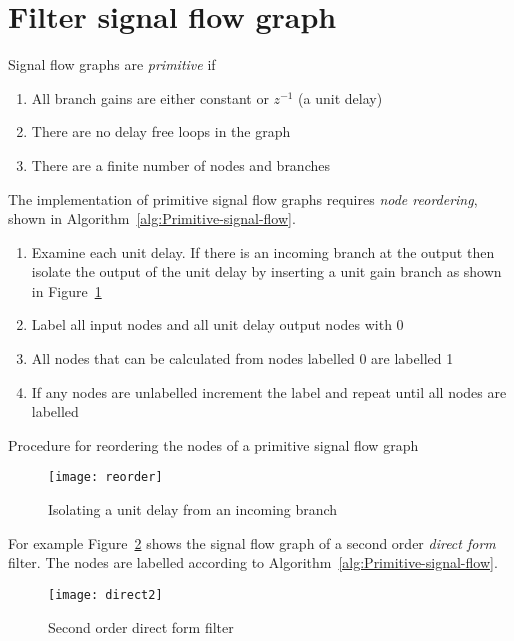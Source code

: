 \documentclass[a4paper,twoside,10pt,english]{report}
\begin{document}
\section{Filter signal flow graph}
Signal flow graphs are \emph{primitive} if 
\begin{enumerate}
\item All branch gains are either constant or $z^{-1}$ (a unit delay)
\item There are no delay free loops in the graph
\item There are a finite number of nodes and branches
\end{enumerate}
The implementation of primitive signal flow graphs requires \emph{node
reordering}, shown in Algorithm~\ref{alg:Primitive-signal-flow}.
\begin{algorithm}[!htbp]
\begin{enumerate}
\item \noindent Examine each unit delay. If there is an incoming branch
at the output then isolate the output of the unit delay by inserting
a unit gain branch as shown in Figure~\ref{fig:Isolating-a-unit}
\item \noindent Label all input nodes and all unit delay output nodes with 0
\item \noindent All nodes that can be calculated from nodes labelled 0 are
labelled 1
\item \noindent If any nodes are unlabelled increment the label and repeat
until all nodes are labelled
\end{enumerate}
\caption{\label{alg:Primitive-signal-flow}Procedure for reordering the nodes of
  a primitive signal flow graph}
\end{algorithm}
\noindent 
\begin{figure}[!htbp]
\begin{center}
\texttt{[image: reorder]}
\caption{Isolating a unit delay from an incoming branch}
\label{fig:Isolating-a-unit}
\end{center}
\end{figure}
For example Figure~\ref{fig:Second-order-direct} shows the signal flow graph of
a second order \emph{direct form }filter. The nodes are labelled according to 
Algorithm~\ref{alg:Primitive-signal-flow}.
\begin{figure}[!htbp]
\begin{center}
\texttt{[image: direct2]}
\caption{Second order direct form filter}
\label{fig:Second-order-direct}
\end{center}
\end{figure}
\end{document}
